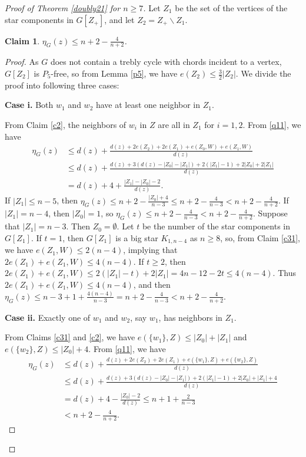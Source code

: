 \documentclass[12pt]{article}
\newtheorem {claim}{Claim}[section]
\begin{document}
\begin{proof}[Proof of Theorem \ref{doubly21} for $n\ge 7$]
Let $Z_1$ be the set of the vertices of the star components in $G[Z_+]$, and let $Z_2=Z_+\backslash Z_1$.


\begin{claim}\label{51}
$\eta_{G}(z)\le n+2-\frac{4}{n+2}$.
\end{claim}
\begin{proof}
As $G$ does not contain a trebly cycle with chords incident to a vertex, $G[Z_2]$ is $P_5$-free, so
from Lemma \ref{p5}, we have $e(Z_2)\le \frac{3}{2}|Z_2|$.
We divide the proof into following three cases:

\noindent
{\bf Case i.} Both $w_1$ and $w_2$ have at least one neighbor in $Z_1$.

From Claim \ref{c2}, the neighbors of $w_i$ in $Z$ are all in $Z_1$ for $i=1,2$.
From \eqref{q11}, we have
\begin{align*}
\eta_G(z)&\le  d(z)+\frac{d(z)+2e(Z_2)+2e(Z_1)+e(Z_0,W)+e(Z_1,W)}{d(z)}\\
&\le d(z)+\frac{d(z)+3(d(z)-|Z_0|-|Z_1|)+2(|Z_1|-1)+2|Z_0|+2|Z_1|}{d(z)}\\
&=d(z)+4+\frac{|Z_1|-|Z_0|-2}{d(z)}.
\end{align*}
If $|Z_1|\le n-5$, then $\eta_G(z)\le n+2-\frac{|Z_0|+4}{n-3}\le n+2-\frac{4}{n-3}<n+2-\frac{4}{n+2}$.
If $|Z_1|=n-4$, then $|Z_0|=1$, so $\eta_G(z)\le n+2-\frac{4}{n-3}<n+2-\frac{4}{n+2}$.
Suppose that $|Z_1|=n-3$. Then $Z_0=\emptyset$.
Let $t$ be the number of the star components in $G[Z_1]$.
If $t=1$, then $G[Z_1]$ is a big star $K_{1,n-4}$ as $n\ge 8$, so, from Claim \ref{c31}, we have  $e(Z_1,W)\le 2(n-4)$, implying that  $2e(Z_1)+e(Z_1,W)\le 4(n-4)$.
If $t\ge 2$, then $2e(Z_1)+e(Z_1,W)\le 2(|Z_1|-t)+2|Z_1|=4n-12-2t\le 4(n-4)$.
Thus $2e(Z_1)+e(Z_1,W)\le 4(n-4)$, and then $\eta_G(z)\le n-3+1+\frac{4(n-4)}{n-3}=n+2-\frac{4}{n-3}<n+2-\frac{4}{n+2}$.

\noindent
{\bf Case ii.}  Exactly  one of $w_1$ and $w_2$, say $w_1$, has neighbors in $Z_1$.


From Claims \ref{c31} and \ref{c2}, we have $e(\{w_1\},Z)\le |Z_0|+|Z_1|$ and $e(\{w_2\},Z)\le |Z_0|+4$.
From \eqref{q11}, we have
\begin{align*}
\eta_G(z)&\le  d(z)+\frac{d(z)+2e(Z_2)+2e(Z_1)+e(\{w_1\},Z)+e(\{w_2\},Z)}{d(z)}\\
&\le d(z)+\frac{d(z)+3(d(z)-|Z_0|-|Z_1|)+2(|Z_1|-1)+2|Z_0|+|Z_1|+4}{d(z)}\\
&=d(z)+4-\frac{|Z_0|-2}{d(z)}\le n+1+\frac{2}{n-3}\\
&<n+2-\frac{4}{n+2}.
\end{align*}


\end{proof}
\end{proof}
\end{document}
